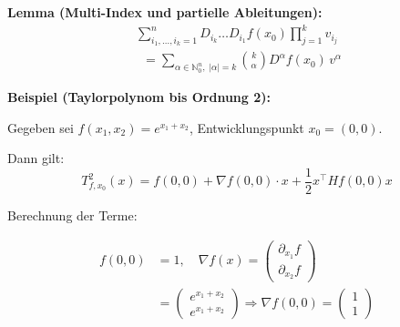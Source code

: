 \textbf{Lemma (Multi-Index und partielle Ableitungen):}
\begin{align*}
\sum_{i_1, \dots, i_k=1}^n D_{i_k} \dots D_{i_1} f(x_0) \prod_{j=1}^k v_{i_j} 
\end{align*}
\begin{align*}
&= \sum_{\alpha \in \mathbb{N}_0^n,\; |\alpha| = k} 
\binom{k}{\alpha} D^\alpha f(x_0)\, v^\alpha
\end{align*}


\textbf{Beispiel (Taylorpolynom bis Ordnung 2):}

Gegeben sei \( f(x_1, x_2) = e^{x_1 + x_2} \), Entwicklungspunkt \( x_0 = (0, 0) \).

Dann gilt:
\[
T^2_{f, x_0}(x) 
= f(0, 0) 
+ \nabla f(0,0) \cdot x 
+ \frac{1}{2} x^\top Hf(0,0) x
\]

Berechnung der Terme:

\[
\begin{aligned}
f(0,0) &= 1, \quad 
\nabla f(x) = \begin{pmatrix} \partial_{x_1} f \\ \partial_{x_2} f \end{pmatrix} \\
&= \begin{pmatrix} e^{x_1+x_2} \\ e^{x_1+x_2} \end{pmatrix}
\Rightarrow \nabla f(0,0) = \begin{pmatrix} 1 \\ 1 \end{pmatrix}
\end{aligned}
\]



